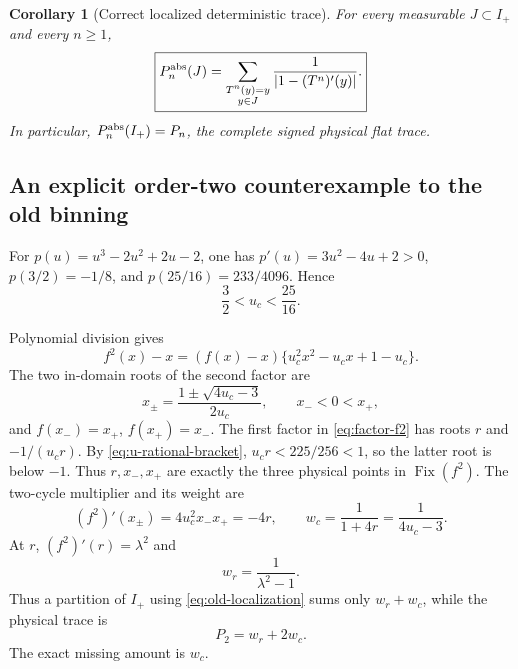 \documentclass[11pt]{article}
\newtheorem{corollary}[theorem]{Corollary}
\theoremstyle{remark}
\newcommand{\Fix}{\operatorname{Fix}}
\begin{document}
\begin{corollary}[Correct localized deterministic trace]
\label{cor:Pabs-folded}
For every measurable $J\subset I_+$ and every $n\ge1$,
\begin{equation}\label{eq:Pabs-folded}
 \boxed{
 P_n^{\rm abs}(J)
 =\sum_{\substack{T^n(y)=y\\y\in J}}
  \frac1{|1-(T^n)'(y)|}.}
\end{equation}
In particular, $P_n^{\rm abs}(I_+)=P_n$, the complete signed physical flat
trace.
\end{corollary}

\subsection{An explicit order-two counterexample to the old binning}

For $p(u)=u^3-2u^2+2u-2$, one has
$p'(u)=3u^2-4u+2>0$,
$p(3/2)=-1/8$, and $p(25/16)=233/4096$.  Hence
\begin{equation}\label{eq:u-rational-bracket}
 \frac32<u_c<\frac{25}{16}.
\end{equation}

Polynomial division gives
\begin{equation}\label{eq:factor-f2}
 f^2(x)-x=(f(x)-x)
 \{u_c^2x^2-u_cx+1-u_c\}.
\end{equation}
The two in-domain roots of the second factor are
\begin{equation}\label{eq:xpm}
 x_\pm=\frac{1\pm\sqrt{4u_c-3}}{2u_c},
 \qquad x_-<0<x_+,
\end{equation}
and $f(x_-)=x_+$, $f(x_+)=x_-$.  The first factor in
\eqref{eq:factor-f2} has roots $r$ and $-1/(u_cr)$.  By
\eqref{eq:u-rational-bracket}, $u_cr<225/256<1$, so the latter root is below
$-1$.  Thus $r,x_-,x_+$ are exactly the three physical points in
$\Fix(f^2)$.  The two-cycle multiplier and its weight are
\begin{equation}\label{eq:cycle-weight}
 (f^2)'(x_\pm)=4u_c^2x_-x_+=-4r,
 \qquad
 w_c=\frac1{1+4r}=\frac1{4u_c-3}.
\end{equation}
At $r$, $(f^2)'(r)=\lambda^2$ and
\begin{equation}\label{eq:fixed-weight}
 w_r=\frac1{\lambda^2-1}.
\end{equation}
Thus a partition of $I_+$ using \eqref{eq:old-localization} sums only
$w_r+w_c$, while the physical trace is
\begin{equation}\label{eq:missing-weight}
 P_2=w_r+2w_c.
\end{equation}
The exact missing amount is $w_c$.
\end{document}
